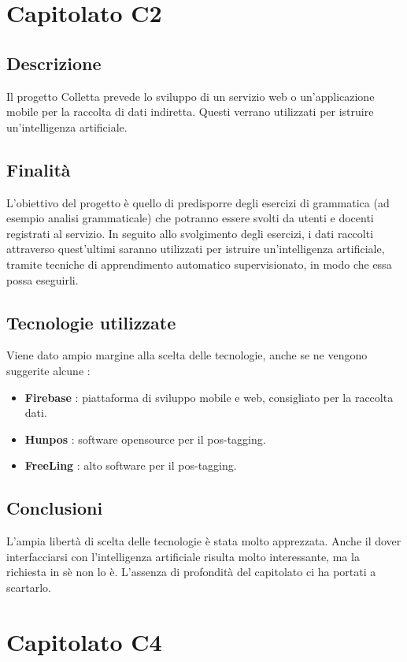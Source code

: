 \documentclass{article}
\begin{document}
\newpage
		\section{Capitolato C2}
			\subsection{Descrizione}
				Il progetto Colletta prevede lo sviluppo di un servizio web o un'applicazione mobile per la raccolta di dati indiretta. Questi verrano utilizzati per istruire un'intelligenza artificiale.
			\subsection{Finalità}
				L'obiettivo del progetto è quello di predisporre degli esercizi di grammatica (ad esempio analisi grammaticale) che potranno essere svolti da utenti e docenti registrati al servizio.
				In seguito allo svolgimento degli esercizi, i dati raccolti attraverso quest'ultimi saranno utilizzati per istruire un'intelligenza artificiale, tramite tecniche di apprendimento automatico supervisionato, in modo che essa possa eseguirli.
			\subsection{Tecnologie utilizzate}
				Viene dato ampio margine alla scelta delle tecnologie, anche se ne vengono suggerite alcune :
				\begin{itemize}
					\item \textbf{Firebase} : piattaforma di sviluppo mobile e web, consigliato per la raccolta dati.
					\item \textbf{Hunpos} : software opensource per il pos-tagging.
					\item \textbf{FreeLing} : alto software per il pos-tagging.
				\end{itemize} 
			\subsection{Conclusioni}
				L'ampia libertà di scelta delle tecnologie è stata molto apprezzata. Anche il dover interfacciarsi con l'intelligenza artificiale risulta molto interessante, ma la richiesta in sè non lo è. L'assenza di profondità del capitolato ci ha portati a scartarlo.
\newpage
	\section{Capitolato C4}
\end{document}

